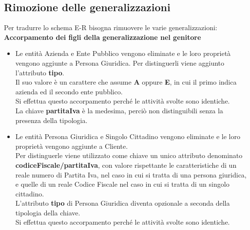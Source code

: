 \documentclass[legalpaper]{article}
\begin{document}
\subsection{Rimozione delle generalizzazioni}
Per tradurre lo schema E-R bisogna rimuovere le varie generalizzazioni:\\
\newline
\textbf{Accorpamento dei figli della generalizzazione nel genitore}
\begin{itemize}
	\item Le entità Azienda e Ente Pubblico vengono eliminate e le loro proprietà vengono aggiunte a Persona Giuridica. Per distinguerli viene aggiunto l'attributo \textbf{tipo}. \\Il suo valore è un carattere che assume \textbf{A} oppure \textbf{E}, in cui il primo indica azienda ed il secondo ente pubblico.\\
	Si effettua questo accorpamento perché le attività svolte sono identiche. \\La chiave \textbf{partitaIva} è la medesima, perciò non distinguibili senza la presenza della tipologia.
	\item Le entità Persona Giuridica e Singolo Cittadino vengono eliminate e le loro proprietà vengono aggiunte a Cliente. \\Per distinguerle viene utilizzato come chiave un unico attributo denominato \textbf{codiceFiscale/partitaIva}, con valore rispettante le caratteristiche di un reale numero di Partita Iva, nel caso in cui si tratta di una persona giuridica, e quelle di un reale Codice Fiscale nel caso in cui si tratta di un singolo cittadino.\\ L'attributo \textbf{tipo} di Persona Giuridica diventa opzionale a seconda della tipologia della chiave.\\
	Si effettua questo accorpamento perché le attività svolte sono identiche.
\end{itemize}

\newpage
\end{document}
